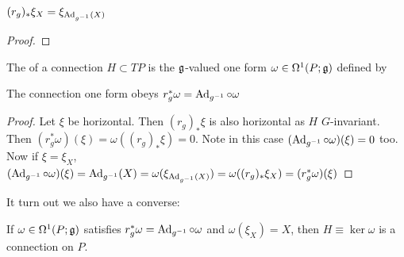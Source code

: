 \documentclass{article}
\begin{document}
\begin{lemma}
	$(r_g)_\ast \xi_X = \xi_{\operatorname{Ad}_{g^{-1}}(X)}$
\end{lemma}
\begin{proof}
\end{proof}

\begin{definition}
	The  of a connection $H \subset TP$ is the $\mathfrak{g}$-valued one form $\omega \in \Omega^1(P;\mathfrak{g})$ defined by 
\end{definition}

\begin{prop}
	The connection one form obeys $r_g^\ast \omega = \operatorname{Ad}_{g^{-1}} \circ \omega$
\end{prop}
\begin{proof}
	Let $\xi$ be horizontal. Then $(r_g)_\ast \xi$ is also horizontal as $H$ $G$-invariant. Then $(r_g^\ast \omega)(\xi) = \omega((r_g)_\ast \xi) = 0$. Note in this case $(\operatorname{Ad}_{g^{-1}} \circ \omega)(\xi) = 0$ too. \\
	Now if $\xi = \xi_X$, $(\operatorname{Ad}_{g^{-1}} \circ \omega)(\xi) = \operatorname{Ad}_{g^{-1}}(X) = \omega(\xi_{\operatorname{Ad}_{g^{-1}}(X)}) = \omega((r_g)_\ast \xi_X) = (r_g^\ast \omega)(\xi)$
\end{proof}
It turn out we also have a converse:
\begin{prop}
	If $\omega \in \Omega^1(P;\mathfrak{g})$ satisfies $r_g^\ast \omega = \operatorname{Ad}_{g^{-1}} \circ \omega$ and $\omega(\xi_X) = X$, then $H\equiv \ker \omega$ is a connection on $P$. 
\end{prop}
\end{document}
